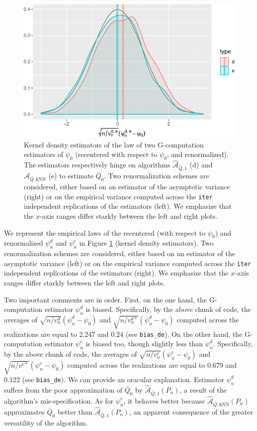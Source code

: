 \documentclass[11pt,openright,twoside]{book}
\newcommand{\Algo}{\widehat{\mathcal{A}}}
\newcommand{\Qbar}{\bar{Q}}
\theoremstyle{definition}
\theoremstyle{definition}
\theoremstyle{definition}
\theoremstyle{remark}
\begin{document}
\begin{figure}

{\centering \includegraphics[width=0.7\linewidth]{img/estimating-Qbar-one-bis-1} 

}

\caption{Kernel density estimators of the law of two G-computation estimators of \(\psi_{0}\) (recentered with respect to \(\psi_{0}\), and renormalized). The estimators respectively hinge on algorithms \(\Algo_{\Qbar,1}\) (d) and \(\Algo_{\Qbar,\text{kNN}}\) (e) to estimate \(\Qbar_{0}\). Two renormalization schemes are considered, either based on an estimator of the asymptotic variance (right) or on the empirical variance computed across the \texttt{iter} independent replications of the estimators (left). We emphasize that the \(x\)-axis ranges differ starkly between the left and right plots.}\label{fig:estimating-Qbar-one-bis}
\end{figure}

We represent the empirical laws of the recentered (with respect to \(\psi_{0}\))
and renormalized \(\psi_{n}^{d}\) and \(\psi_{n}^{e}\) in Figure
\ref{fig:estimating-Qbar-one-bis} (kernel density estimators). Two
renormalization schemes are considered, either based on an estimator of the
asymptotic variance (left) or on the empirical variance computed across the
\texttt{iter} independent replications of the estimators (right). We emphasize that
the \(x\)-axis ranges differ starkly between the left and right plots.

Two important comments are in order. First, on the one hand, the
G-computation estimator \(\psi_{n}^{d}\) is biased. Specifically, by the above
chunk of code, the averages of \(\sqrt{n/v_{n}^{d}} (\psi_{n}^{d} - \psi_{0})\)
and \(\sqrt{n/v_{n}^{d*}} (\psi_{n}^{d} - \psi_{0})\) computed across the
realizations are equal to 2.247 and 0.24 (see \texttt{bias\_de}). On the other hand, the G-computation
estimator \(\psi_{n}^{e}\) is biased too, though slightly less than
\(\psi_{n}^{d}\). Specifically, by the above chunk of code, the averages of
\(\sqrt{n/v_{n}^{e}} (\psi_{n}^{e} - \psi_{0})\) and \(\sqrt{n/v^{e*}} (\psi_{n}^{e} - \psi_{0})\) computed across the realizations are equal to
0.679 and 0.122 (see
\texttt{bias\_de}). We can provide an oracular explanation. Estimator \(\psi_{n}^{d}\)
suffers from the poor approximation of \(\Qbar_{0}\) by
\(\Algo_{\Qbar,1}(P_{n})\), a result of the algorithm's mis-specification. As
for \(\psi_{n}^{e}\), it behaves better because \(\Algo_{\Qbar,\text{kNN}} (P_{n})\) approximates \(\Qbar_{0}\) better than \(\Algo_{\Qbar,1}(P_{n})\), an
apparent consequence of the greater versatility of the algorithm.
\end{document}
